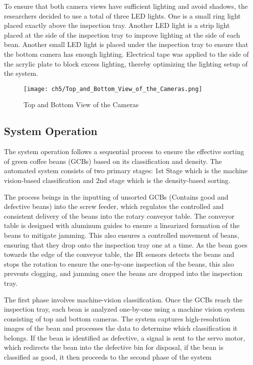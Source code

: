 To ensure that both camera views have sufficient lighting and avoid shadows, the researchers decided to use a total of three LED lights. One is a small ring light placed exactly above the inspection tray. Another LED light is a strip light placed at the side of the inspection tray to improve lighting at the side of each bean. Another small LED light is placed under the inspection tray to ensure that the bottom camera has enough lighting. Electrical tape was applied to the side of the acrylic plate to block excess lighting, thereby optimizing the lighting setup of the system.

\begin{figure}[H]
    \centering
    \texttt{[image: ch5/Top\_and\_Bottom\_View\_of\_the\_Cameras.png]}
    \caption{Top and Bottom View of the Cameras}
    \label{fig:top_and_bottom}
\end{figure}

\subsection{System Operation}

The system operation follows a sequential process to ensure the effective sorting of green coffee beans (GCBs) based on its classification and density. The automated system consists of two primary stages: 1st Stage which is the machine vision-based classification and 2nd stage which is the density-based sorting.

The process beings in the inputting of unsorted GCBs (Contains good and defective beans) into the screw feeder, which regulates the controlled and consistent delivery of the beans into the rotary conveyor table. The conveyor table is designed with aluminum guides to ensure a linearized formation of the beans to mitigate jamming. This also ensures a controlled movement of beans, ensuring that they drop onto the inspection tray one at a time. As the bean goes towards the edge of the conveyor table, the IR sensors detects the beans and stops the rotation to ensure the one-by-one inspection of the beans, this also prevents clogging, and jamming once the beans are dropped into the inspection tray. 

The first phase involves machine-vision classification. Once the GCBs reach the inspection tray, each bean is analyzed one-by-one using a machine vision system consisting of top and bottom cameras. The system captures high-resolution images of the bean and processes the data to determine which classification it belongs. If the bean is identified as defective, a signal is sent to the servo motor, which redirects the bean into the defective bin for disposal, if the bean is classified as good, it then proceeds to the second phase of the system


